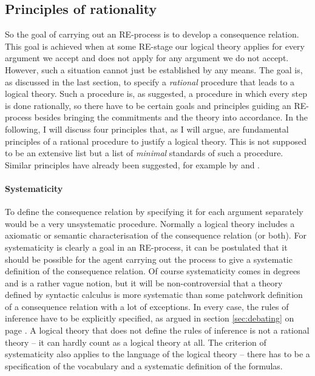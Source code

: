 \documentclass{article}
\begin{document}
\subsection{Principles of rationality}
So the goal of carrying out an RE-process is to develop a consequence relation. This goal is achieved when at some RE-stage our logical theory applies for every argument we accept and does not apply for any argument we do not accept. However, such a situation cannot just be established by any means. The goal is, as discussed in the last section, to specify a \textit{rational} procedure that leads to a logical theory. Such a procedure is, as suggested, a procedure in which every step is done rationally, so there have to be certain goals and principles guiding an RE-process besides bringing the commitments and the theory into accordance. In the following, I will discuss four principles that, as I will argue, are fundamental principles of a rational procedure to justify a logical theory. This is not supposed to be an extensive list but a list of \textit{minimal} standards of such a procedure. Similar principles have already been suggested, for example by  and .

\paragraph{Systematicity} To define the consequence relation by specifying it for each argument separately would be a very unsystematic procedure. Normally a logical theory includes a axiomatic or semantic characterisation of the consequence relation (or both). For systematicity is clearly a goal in an RE-process, it can be postulated that it should be possible for the agent carrying out the process to give a systematic definition of the consequence relation. Of course systematicity comes in degrees and is a rather vague notion, but it will be non-controversial that a theory defined by syntactic calculus is more systematic than some patchwork definition of a consequence relation with a lot of exceptions. In every case, the rules of inference have to be explicitly specified, as argued in section \ref{sec:debating} on page \pageref{sec:debating}. A logical theory that does not define the rules of inference is not a rational theory -- it can hardly count as a logical theory at all. The criterion of systematicity also applies to the language of the logical theory -- there has to be a specification of the vocabulary and a systematic definition of the formulas. 
\end{document}

